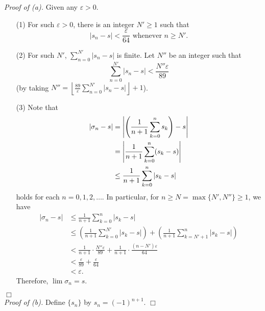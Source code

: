 \documentclass{article}
\begin{document}
\emph{Proof of (a).}
Given any $\varepsilon > 0$.
\begin{enumerate}
\item[(1)]
For such $\varepsilon > 0$, there is an integer $N' \geq 1$ such that
$$|s_n-s| < \frac{\varepsilon}{64} \text{ whenever } n \geq N'.$$
\item[(2)]
For such $N'$, $\sum_{n=0}^{N'} |s_n-s|$ is finite.
Let $N''$ be an integer such that $$\sum_{n=0}^{N'} |s_n-s| < \frac{N''\varepsilon}{89}$$
(by taking $N'' = \left\lfloor \frac{89}{\varepsilon}\sum_{n=0}^{N'} |s_n-s| \right\rfloor + 1$).
\item[(3)]
Note that
  \begin{align*}
  |\sigma_n - s|
  &= \abs{ \left(\frac{1}{n+1}\sum_{k=0}^n s_k\right) - s } \\
  &= \abs{ \frac{1}{n+1}\sum_{k=0}^n (s_k - s) } \\
  &\leq \frac{1}{n+1}\sum_{k=0}^n |s_k - s|
  \end{align*}
holds for each $n=0,1,2,\ldots$.
In particular, for $n \geq N = \max\{N', N''\} \geq 1$, we have
  \begin{align*}
  |\sigma_{n} - s|
  &\leq \frac{1}{n+1}\sum_{k=0}^{n} |s_k - s| \\
  &\leq \left( \frac{1}{n+1}\sum_{k=0}^{N'}|s_k - s| \right)
    + \left( \frac{1}{n+1}\sum_{k=N'+1}^{n}|s_k - s| \right) \\
  &< \frac{1}{n+1} \cdot \frac{N''\varepsilon}{89}
    + \frac{1}{n+1} \cdot \frac{(n-N')\varepsilon}{64} \\
  &< \frac{\varepsilon}{89} + \frac{\varepsilon}{64} \\
  &< \varepsilon.
  \end{align*}
Therefore, $\lim \sigma_n = s$.
\end{enumerate}
$\Box$ \\



\emph{Proof of (b).}
Define $\{s_n\}$ by $s_n = (-1)^{n+1}$.
$\Box$ \\
\end{document}
